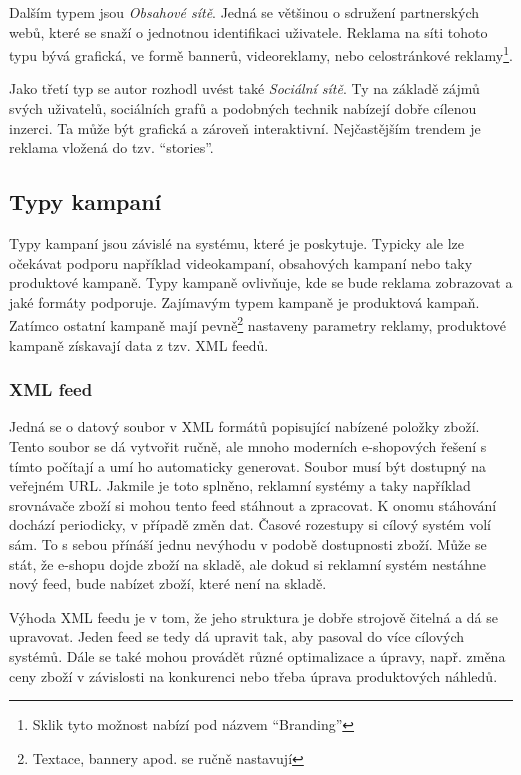 Dalším typem jsou \emph{Obsahové sítě}. Jedná se většinou o sdružení partnerských webů, které se snaží o jednotnou identifikaci uživatele. Reklama na síti tohoto typu bývá
grafická, ve formě bannerů, videoreklamy, nebo celostránkové reklamy\footnote{Sklik tyto možnost nabízí pod názvem \enquote{Branding}}.

Jako třetí typ se autor rozhodl uvést také \emph{Sociální sítě}. Ty na základě zájmů svých uživatelů, sociálních grafů a podobných technik nabízejí dobře cílenou inzerci.
Ta může být grafická a zároveň interaktivní. Nejčastějším trendem je reklama vložená do tzv. \enquote{stories}.

\subsection{Typy kampaní}
Typy kampaní jsou závislé na systému, které je poskytuje. Typicky ale lze očekávat podporu například videokampaní, obsahových kampaní nebo taky produktové kampaně.
Typy kampaně ovlivňuje, kde se bude reklama zobrazovat a jaké formáty podporuje. Zajímavým typem kampaně je produktová kampaň. Zatímco ostatní kampaně mají
pevně\footnote{Textace, bannery apod. se ručně nastavují} nastaveny parametry reklamy, produktové kampaně získavají data z tzv. XML feedů. 

\subsubsection{XML feed}
Jedná se o datový soubor v XML formátů popisující nabízené položky zboží. Tento soubor se dá vytvořit ručně, ale mnoho moderních e-shopových řešení
s tímto počítají a umí ho automaticky generovat. Soubor musí být dostupný na veřejném URL. Jakmile je toto splněno, reklamní systémy a taky například
srovnávače zboží si mohou tento feed stáhnout a zpracovat. K onomu stáhování dochází periodicky, v případě změn dat. Časové rozestupy si cílový systém
volí sám. To s sebou přínáší jednu nevýhodu v podobě dostupnosti zboží. Může se stát, že e-shopu dojde zboží na skladě, ale dokud si reklamní systém
nestáhne nový feed, bude nabízet zboží, které není na skladě.

Výhoda XML feedu je v tom, že jeho struktura je dobře strojově čitelná a dá se upravovat. Jeden feed se tedy dá upravit tak, aby pasoval do více
cílových systémů. Dále se také mohou provádět různé optimalizace a úpravy, např. změna ceny zboží v závislosti na konkurenci nebo třeba úprava produktových náhledů.


